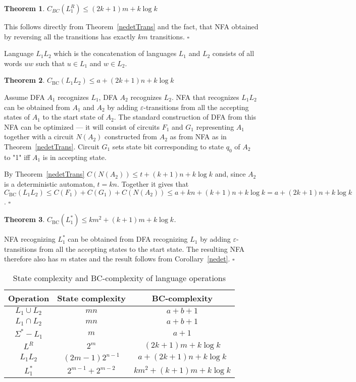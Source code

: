 \documentclass[copyright, creativecommons]{eptcs}
\newcommand{\qed}{$\square$}
\newcommand{\cBC}{C_\mathrm{BC}}
\newtheorem{theorem}{Theorem}[section]
\newenvironment{proof}[1][Proof]{\begin{trivlist}
\item[\hskip \labelsep {\bfseries #1}]}{\end{trivlist}}
\begin{document}
\begin{theorem}
$C_{BC}(L_1^R)\leq (2k+1)m+k\log{k}$
\end{theorem}
\begin{proof}
This follows directly from Theorem~\ref{nedetTrans} and the fact, that NFA obtained by reversing all the
transitions has exactly $km$ transitions.
\qed
\end{proof}

Language $L_1L_2$ which is the concatenation of languages $L_1$ and $L_2$ consists of all words $uw$ such that
$u\in L_1$ and $w\in L_2$.
\begin{theorem}
$\cBC(L_1L_2)\leq a+ (2k+1)n+k\log{k}$
\end{theorem}
\begin{proof}
Assume DFA $A_1$ recognizes $L_1$, DFA $A_2$ recognizes $L_2$.
NFA that recognizes $L_1L_2$ can be obtained from $A_1$ and $A_2$  by adding $\varepsilon$-transitions
from all the accepting states of $A_1$ to the start state of $A_2$.
The standard construction of DFA from this NFA can be optimized --- it will consist of circuits $F_1$ and $G_1$ representing
$A_1$ together with a circuit $N(A_2)$ constructed from $A_2$ as from NFA as in Theorem~\ref{nedetTrans}.
Circuit $G_1$ sets state bit corresponding to state $q_0$ of $A_2$ to "1" iff $A_1$ is in accepting state.

By Theorem~\ref{nedetTrans} $C(N(A_2))\leq t + (k+1)n+k\log{k}$ and, since $A_2$ is a deterministic automaton, $t=kn$. Together
it gives that $\cBC(L_1L_2)\leq C(F_1)+C(G_1)+C(N(A_2))\leq a+kn+(k+1)n + k\log{k}=a+(2k+1)n+k\log{k}$.
\qed
\end{proof}


\begin{theorem}
$\cBC(L_1^*)\leq km^2+(k+1)m+k\log k$.
\end{theorem}
\begin{proof}
NFA recognizing $L_1^*$ can be obtained from DFA recognizing $L_1$ by adding $\varepsilon$-transitions from
all the accepting states to the start state. The resulting NFA therefore also has $m$ states and the result
follows from Corollary~\ref{nedet}.
\qed
\end{proof}

\begin{table}[htb]
\centering
\begin{tabular}{|c|c|c|}\hline
Operation & State complexity & BC-complexity\\\hline
$L_1 \cup L_2$ & $mn$ & $a+b+1$\\\hline
$L_1 \cap L_2$ & $mn$ & $a+b+1$\\\hline
$\Sigma^* - L_1$ & $m$ & $a+1$\\\hline
$L^R$ & $2^m$ & $ (2k+1)m+k\log{k}$\\\hline
$L_1L_2$ & $(2m-1)2^{n-1}$ & $a+(2k+1)n+k\log{k}$\\\hline
$L_1^*$ & $2^{m-1}+2^{m-2}$ & $ km^2+(k+1)m+k\log{k}$\\\hline
\end{tabular}
\caption{State complexity and BC-complexity of language operations}
\label{valoduOperacijas}
\end{table}
\end{document}
